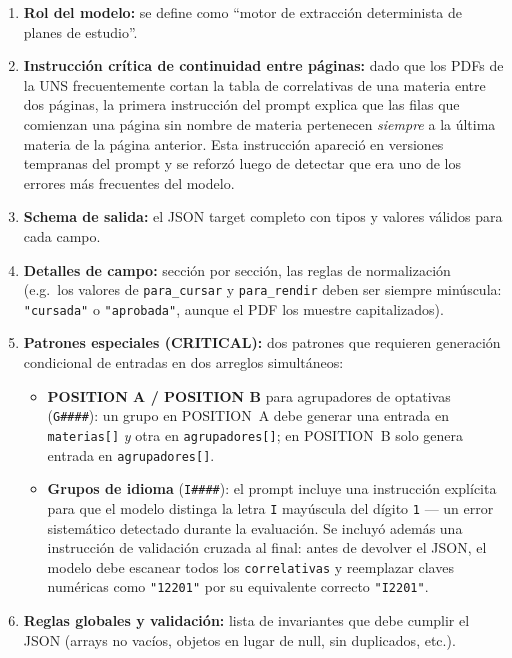 \documentclass[12pt, a4paper]{report}
\begin{document}
\begin{enumerate}
  \item \textbf{Rol del modelo:} se define como ``motor de extracción determinista
        de planes de estudio''.
  \item \textbf{Instrucción crítica de continuidad entre páginas:} dado que los
        PDFs de la UNS frecuentemente cortan la tabla de correlativas de una materia
        entre dos páginas, la primera instrucción del prompt explica que las filas
        que comienzan una página sin nombre de materia pertenecen \emph{siempre} a la
        última materia de la página anterior. Esta instrucción apareció en versiones
        tempranas del prompt y se reforzó luego de detectar que era uno de los errores
        más frecuentes del modelo.
  \item \textbf{Schema de salida:} el JSON target completo con tipos y valores
        válidos para cada campo.
  \item \textbf{Detalles de campo:} sección por sección, las reglas de normalización
        (e.g.\ los valores de \texttt{para\_cursar} y \texttt{para\_rendir} deben
        ser siempre minúscula: \texttt{"cursada"} o \texttt{"aprobada"}, aunque el PDF
        los muestre capitalizados).
  \item \textbf{Patrones especiales (CRITICAL):} dos patrones que requieren
        generación condicional de entradas en dos arreglos simultáneos:
        \begin{itemize}
          \item \textbf{POSITION A / POSITION B} para agrupadores de optativas
                (\texttt{G\#\#\#\#}): un grupo en POSITION~A debe generar una entrada
                en \texttt{materias[]} \emph{y} otra en \texttt{agrupadores[]};
                en POSITION~B solo genera entrada en \texttt{agrupadores[]}.
          \item \textbf{Grupos de idioma} (\texttt{I\#\#\#\#}): el prompt incluye
                una instrucción explícita para que el modelo distinga la letra
                \texttt{I} mayúscula del dígito \texttt{1} --- un error sistemático
                detectado durante la evaluación. Se incluyó además una instrucción
                de validación cruzada al final: antes de devolver el JSON, el modelo
                debe escanear todos los \texttt{correlativas} y reemplazar claves
                numéricas como \texttt{"12201"} por su equivalente correcto
                \texttt{"I2201"}.
        \end{itemize}
  \item \textbf{Reglas globales y validación:} lista de invariantes que debe
        cumplir el JSON (arrays no vacíos, objetos en lugar de null, sin duplicados,
        etc.).
\end{enumerate}
\end{document}
